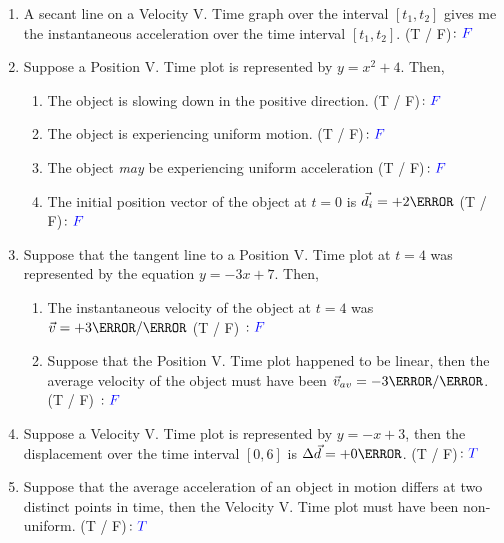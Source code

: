\documentclass[12pt]{article} %
\begin{document}
\begin{qstn}[1]
\begin{enumerate}
        \item A secant line on a Velocity V. Time graph over the interval $[t_1,t_2]$ gives me the instantaneous acceleration over the time interval $[t_1,t_2]$. (T / F)$\colon \textcolor{blue}{F}$
        \item Suppose a Position V. Time plot is represented by $y = x^2 + 4$. Then,
            \begin{enumerate}[label = (\alph*)]
                \item The object is slowing down in the positive direction. (T / F)$\colon \textcolor{blue}{F}$
                \item The object is experiencing uniform motion. (T / F)$\colon \textcolor{blue}{F}$
                \item The object \emph{may} be experiencing uniform acceleration (T / F)$\colon \textcolor{blue}{F}$
                \item The initial position vector of the object at $t = 0$ is $\vec d_i = +2 \m$ (T / F)$\colon \textcolor{blue}{F}$
            \end{enumerate}
        \item Suppose that the tangent line to a Position V. Time plot at $t = 4$ was represented by the equation $y = -3x + 7$. Then,
            \begin{enumerate}[label = (\alph*)]
                \item The instantaneous velocity of the object at $t = 4$ was $\vec v = +3 \m / \s$ (T / F) $\colon \textcolor{blue}{F}$
                \item Suppose that the Position V. Time plot happened to be linear, then the average velocity of the object must have been $\vec v_{av} = -3\m / \s$. (T / F) $\colon \textcolor{blue}{F}$
            \end{enumerate}
        \item Suppose a Velocity V. Time plot is represented by $y = -x + 3$, then the displacement over the time interval $[0,6]$ is $\Delta \vec d = +0 \m$. (T / F)$\colon \textcolor{blue}{T}$
        \item Suppose that the average acceleration of an object in motion differs at two distinct points in time, then the Velocity V. Time plot must have been non-uniform. (T / F)$\colon \textcolor{blue}{T}$

    \end{enumerate}

 \end{qstn}
\end{document}
